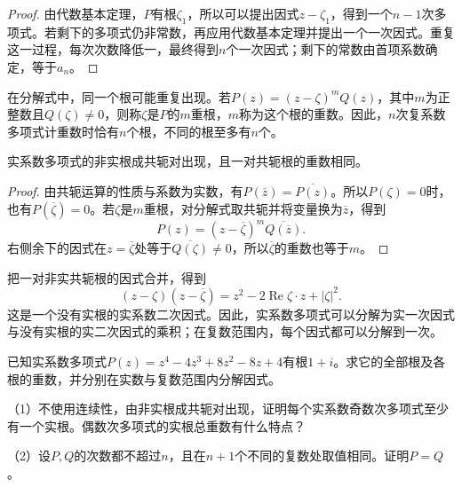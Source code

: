 \begin{proof}
由代数基本定理，\(P\)有根\(\zeta_{1}\)，所以可以提出因式\(z - \zeta_{1}\)，得到一个\(n - 1\)次多项式。若剩下的多项式仍非常数，再应用代数基本定理并提出一个一次因式。重复这一过程，每次次数降低一，最终得到\(n\)个一次因式；剩下的常数由首项系数确定，等于\(a_{n}\)。
\end{proof}

在分解式中，同一个根可能重复出现。若\(P(z)=(z-\zeta)^mQ(z)\)，其中\(m\)为正整数且\(Q(\zeta)\ne0\)，则称\(\zeta\)是\(P\)的{\heiti{}\(m\)重根}，\(m\)称为这个根的{\heiti{}重数}。因此，\(n\)次复系数多项式计重数时恰有\(n\)个根，不同的根至多有\(n\)个。

\begin{proposition}\label{prop:complex-conjugate-roots}
实系数多项式的非实根成共轭对出现，且一对共轭根的重数相同。
\end{proposition}

\begin{proof}
由共轭运算的性质与系数为实数，有\(P \left( \overline{z} \right) = \overline{P \left( z \right)}\)。所以\(P \left( \zeta \right) = 0\)时，也有\(P \left( \overline{\zeta} \right) = 0\)。若\(\zeta\)是\(m\)重根，对分解式取共轭并将变量换为\(\overline{z}\)，得到
\begin{equation}
    P \left( z \right) = \left( z - \overline{\zeta} \right)^{m} \overline{Q \left( \overline{z} \right)} .
\end{equation}
右侧余下的因式在\(z = \overline{\zeta}\)处等于\(\overline{Q \left( \zeta \right)} \ne 0\)，所以\(\overline{\zeta}\)的重数也等于\(m\)。
\end{proof}

把一对非实共轭根的因式合并，得到
\begin{equation}
    \left( z - \zeta \right) \left( z - \overline{\zeta} \right)
    = z^{2} - 2 \operatorname{Re} \zeta \cdot z + \left| \zeta \right|^{2} .
\end{equation}
这是一个没有实根的实系数二次因式。因此，实系数多项式可以分解为实一次因式与没有实根的实二次因式的乘积；在复数范围内，每个因式都可以分解到一次。

\begin{example}
已知实系数多项式\(P(z)=z^4-4z^3+8z^2-8z+4\)有根\(1+i\)。求它的全部根及各根的重数，并分别在实数与复数范围内分解因式。
\end{example}

\begin{exercise}
\mbox{}\par\nobreak

（1）不使用连续性，由非实根成共轭对出现，证明每个实系数奇数次多项式至少有一个实根。偶数次多项式的实根总重数有什么特点？

（2）设\(P,Q\)的次数都不超过\(n\)，且在\(n+1\)个不同的复数处取值相同。证明\(P=Q\)。
\end{exercise}

